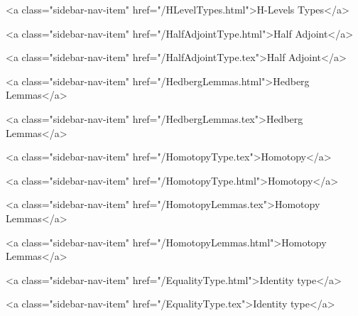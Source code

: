      
        
          <a class="sidebar-nav-item" href="/HLevelTypes.html">H-Levels Types</a>
        
      
    
      
        
          <a class="sidebar-nav-item" href="/HalfAdjointType.html">Half Adjoint</a>
        
      
    
      
        
          <a class="sidebar-nav-item" href="/HalfAdjointType.tex">Half Adjoint</a>
        
      
    
      
        
          <a class="sidebar-nav-item" href="/HedbergLemmas.html">Hedberg Lemmas</a>
        
      
    
      
        
          <a class="sidebar-nav-item" href="/HedbergLemmas.tex">Hedberg Lemmas</a>
        
      
    
      
        
          <a class="sidebar-nav-item" href="/HomotopyType.tex">Homotopy</a>
        
      
    
      
        
          <a class="sidebar-nav-item" href="/HomotopyType.html">Homotopy</a>
        
      
    
      
        
          <a class="sidebar-nav-item" href="/HomotopyLemmas.tex">Homotopy Lemmas</a>
        
      
    
      
        
          <a class="sidebar-nav-item" href="/HomotopyLemmas.html">Homotopy Lemmas</a>
        
      
    
      
        
          <a class="sidebar-nav-item" href="/EqualityType.html">Identity type</a>
        
      
    
      
        
          <a class="sidebar-nav-item" href="/EqualityType.tex">Identity type</a>
        
      
    
